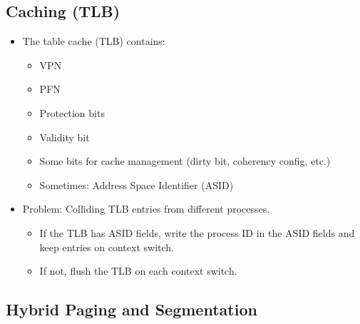         \subsection{Caching (TLB)} %
            \label{sec:cachingpaging}
        
        
            \begin{itemize}
            	\item The table cache (TLB) contains:
                	\begin{itemize}
                		\item VPN
                		\item PFN
                		\item Protection bits
                		\item Validity bit
                		\item Some bits for cache management (dirty bit, coherency config, etc.)
                		\item Sometimes: Address Space Identifier (ASID)
                	\end{itemize}
            	\item Problem: Colliding TLB entries from different processes.
                	\begin{itemize}
                		\item If the TLB has ASID fields, write the process ID in the ASID fields and keep entries on context switch.
                		\item If not, flush the TLB on each context switch.
                	\end{itemize}
            \end{itemize}
    
        \subsection{Hybrid Paging and Segmentation}
	        \label{sec:hybridpaging}
        
